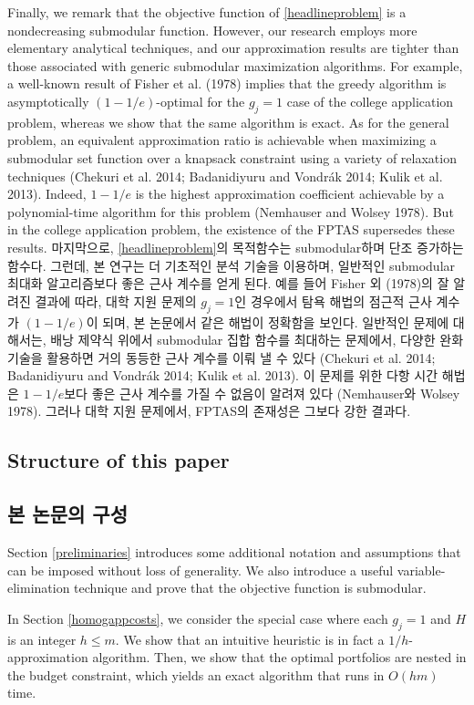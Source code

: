 \documentclass[11pt]{article} %
\theoremstyle{definition}
\theoremstyle{definition}
\begin{document}
\ifen
Finally, we remark that the objective function of \eqref{headlineproblem} is a nondecreasing submodular function. However, our research employs more elementary analytical techniques, and our approximation results are tighter than those associated with generic submodular maximization algorithms. For example, a well-known result of Fisher et al. (1978) implies that the greedy algorithm is asymptotically $(1 - 1/e)$-optimal for the $g_j = 1$ case of the college application problem, whereas we show that the same algorithm is exact. As for the general problem, an equivalent approximation ratio is achievable when maximizing a submodular set function over a knapsack constraint using a variety of relaxation techniques (Chekuri et al. 2014; Badanidiyuru and Vondrák 2014; Kulik et al. 2013). Indeed, $1 - 1/e$ is the highest approximation coefficient achievable by a polynomial-time algorithm for this problem (Nemhauser and Wolsey 1978). But in the college application problem, the existence of the FPTAS supersedes these results.
\else
마지막으로, \eqref{headlineproblem}의 목적함수는 submodular하며 단조 증가하는 함수다. 그런데, 본 연구는 더 기초적인 분석 기술을 이용하며, 일반적인 submodular 최대화 알고리즘보다 좋은 근사 계수를 얻게 된다. 예를 들어 Fisher 외 (1978)의 잘 알려진 결과에 따라, 대학 지원 문제의 $g_j = 1$인 경우에서 탐욕 해법의 점근적 근사 계수가 $(1 - 1/e)$이 되며, 본 논문에서 같은 해법이 정확함을 보인다. 일반적인 문제에 대해서는, 배낭 제약식 위에서 submodular 집합 함수를 최대하는 문제에서, 다양한 완화 기술을 활용하면 거의 동등한 근사 계수를 이뤄 낼 수 있다 (Chekuri et al. 2014; Badanidiyuru and Vondrák 2014; Kulik et al. 2013). 이 문제를 위한 다항 시간 해법은 $1 - 1/e$보다 좋은 근사 계수를 가질 수 없음이 알려져 있다 (Nemhauser와 Wolsey 1978). 그러나 대학 지원 문제에서, FPTAS의 존재성은 그보다 강한 결과다.
\fi

\ifen \subsection{Structure of this paper} \else \subsection{본 논문의 구성}\fi
\ifen Section \ref{preliminaries} introduces some additional notation and assumptions that can be imposed without loss of generality. We also introduce a useful variable-elimination technique and prove that the objective function is submodular. 

In Section \ref{homogappcosts}, we consider the special case where each $g_j = 1$ and $H$ is an integer $h \leq m$.  We show that an intuitive heuristic is in fact a $1/h$-approximation algorithm. Then, we show that the optimal portfolios are nested in the budget constraint, which yields an exact algorithm that runs in $O(hm)$ time. 
\end{document}
